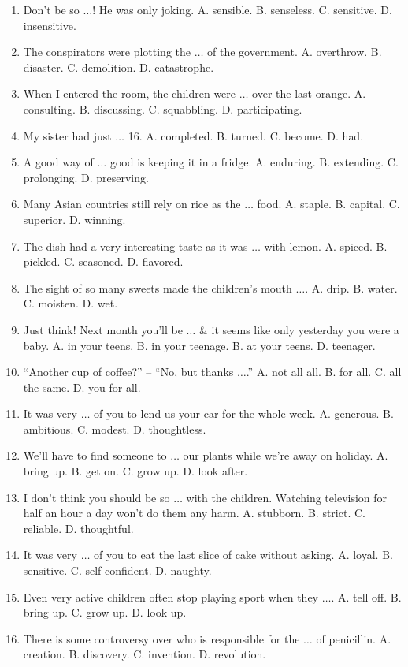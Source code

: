 \documentclass{article}
\numberwithin{equation}{section}
\begin{document}
\begin{enumerate}[leftmargin=5mm]
	\item Don't be so $\ldots$! He was only joking. A. sensible. B. senseless. C. sensitive. D. insensitive.
	\item The conspirators were plotting the $\ldots$ of the government. A. overthrow. B. disaster. C. demolition. D. catastrophe.
	\item When I entered the room, the children were $\ldots$ over the last orange. A. consulting. B. discussing. C. squabbling. D. participating.
	\item My sister had just $\ldots$ 16. A. completed. B. turned. C. become. D. had.
	\item A good way of $\ldots$ good is keeping it in a fridge. A. enduring. B. extending. C. prolonging. D. preserving.
	\item Many Asian countries still rely on rice as the $\ldots$ food. A. staple. B. capital. C. superior. D. winning.
	\item The dish had a very interesting taste as it was $\ldots$ with lemon. A. spiced. B. pickled. C. seasoned. D. flavored.
	\item The sight of so many sweets made the children's mouth $\ldots$. A. drip. B. water. C. moisten. D. wet.
	\item Just think! Next month you'll be $\ldots$ \& it seems like only yesterday you were a baby. A. in your teens. B. in your teenage. B. at your teens. D. teenager.
	\item ``Another cup of coffee?'' -- ``No, but thanks $\ldots$.'' A. not all all. B. for all. C. all the same. D. you for all.
	\item It was very $\ldots$ of you to lend us your car for the whole week. A. generous. B. ambitious. C. modest. D. thoughtless.
	\item We'll have to find someone to $\ldots$ our plants while we're away on holiday. A. bring up. B. get on. C. grow up. D. look after.
	\item I don't think you should be so $\ldots$ with the children. Watching television for half an hour a day won't do them any harm. A. stubborn. B. strict. C. reliable. D. thoughtful.
	\item It was very $\ldots$ of you to eat the last slice of cake without asking. A. loyal. B. sensitive. C. self-confident. D. naughty.
	\item Even very active children often stop playing sport when they $\ldots$. A. tell off. B. bring up. C. grow up. D. look up.
	\item There is some controversy over who is responsible for the $\ldots$ of penicillin. A. creation. B. discovery. C. invention. D. revolution.

\end{enumerate}
\end{document}
